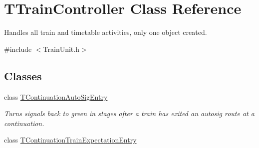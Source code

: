 \hypertarget{class_t_train_controller}{}\section{T\+Train\+Controller Class Reference}
\label{class_t_train_controller}


Handles all train and timetable activities, only one object created.  




{\ttfamily \#include $<$Train\+Unit.\+h$>$}

\subsection*{Classes}
\begin{DoxyCompactItemize}
\item 
class \mbox{\hyperlink{class_t_train_controller_1_1_t_continuation_auto_sig_entry}{T\+Continuation\+Auto\+Sig\+Entry}}
\begin{DoxyCompactList}\small\item\em Turns signals back to green in stages after a train has exited an autosig route at a continuation. \end{DoxyCompactList}\item 
class \mbox{\hyperlink{class_t_train_controller_1_1_t_continuation_train_expectation_entry}{T\+Continuation\+Train\+Expectation\+Entry}}
\end{DoxyCompactItemize}

